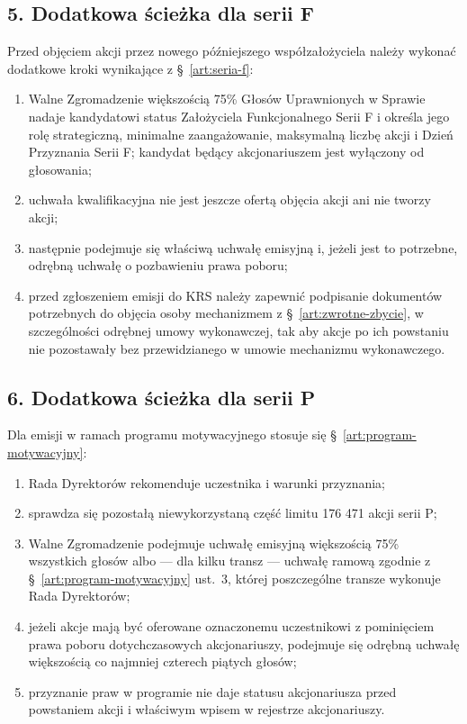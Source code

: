 \documentclass[12pt,a4paper]{report}
\begin{document}
\subsection*{5. Dodatkowa ścieżka dla serii F}

Przed objęciem akcji przez nowego późniejszego współzałożyciela należy wykonać dodatkowe kroki wynikające z §~\ref{art:seria-f}:
\begin{enumerate}
  \item Walne Zgromadzenie większością 75\% Głosów Uprawnionych w Sprawie nadaje kandydatowi status Założyciela Funkcjonalnego Serii F i określa jego rolę strategiczną, minimalne zaangażowanie, maksymalną liczbę akcji i Dzień Przyznania Serii F; kandydat będący akcjonariuszem jest wyłączony od głosowania;
  \item uchwała kwalifikacyjna nie jest jeszcze ofertą objęcia akcji ani nie tworzy akcji;
  \item następnie podejmuje się właściwą uchwałę emisyjną i, jeżeli jest to potrzebne, odrębną uchwałę o pozbawieniu prawa poboru;
  \item przed zgłoszeniem emisji do KRS należy zapewnić podpisanie dokumentów potrzebnych do objęcia osoby mechanizmem z §~\ref{art:zwrotne-zbycie}, w szczególności odrębnej umowy wykonawczej, tak aby akcje po ich powstaniu nie pozostawały bez przewidzianego w umowie mechanizmu wykonawczego.
\end{enumerate}

\subsection*{6. Dodatkowa ścieżka dla serii P}

Dla emisji w ramach programu motywacyjnego stosuje się §~\ref{art:program-motywacyjny}:
\begin{enumerate}
  \item Rada Dyrektorów rekomenduje uczestnika i warunki przyznania;
  \item sprawdza się pozostałą niewykorzystaną część limitu 176 471 akcji serii P;
  \item Walne Zgromadzenie podejmuje uchwałę emisyjną większością 75\% wszystkich głosów albo --- dla kilku transz --- uchwałę ramową zgodnie z §~\ref{art:program-motywacyjny} ust.~3, której poszczególne transze wykonuje Rada Dyrektorów;
  \item jeżeli akcje mają być oferowane oznaczonemu uczestnikowi z pominięciem prawa poboru dotychczasowych akcjonariuszy, podejmuje się odrębną uchwałę większością co najmniej czterech piątych głosów;
  \item przyznanie praw w programie nie daje statusu akcjonariusza przed powstaniem akcji i właściwym wpisem w rejestrze akcjonariuszy.
\end{enumerate}
\end{document}
